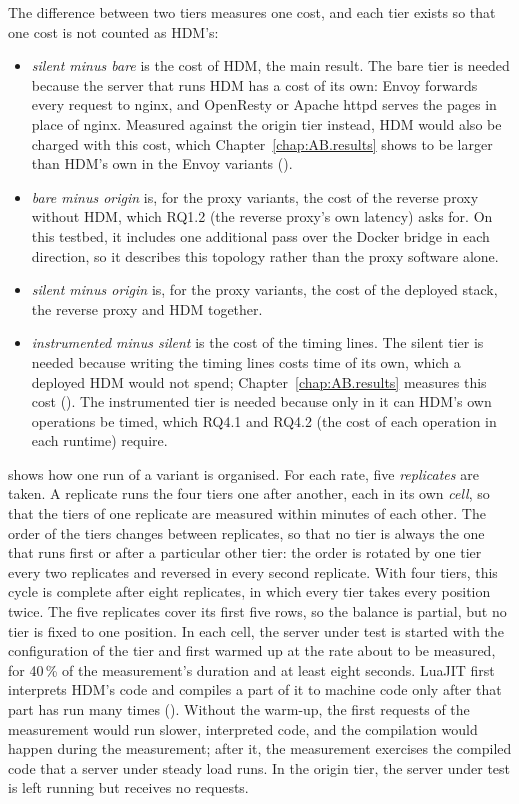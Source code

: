 \documentclass{rptuma}
\begin{document}
The difference between two tiers measures one cost, and each tier exists so that one cost is not
counted as HDM's:
\begin{itemize}
  \item \emph{silent minus bare} is the cost of HDM, the main result. The bare tier is needed because
    the server that runs HDM has a cost of its own: Envoy forwards every request to nginx, and
    OpenResty or Apache httpd serves the pages in place of nginx. Measured against the origin tier
    instead, HDM would also be charged with this cost, which Chapter~\ref{chap:AB.results} shows to
    be larger than HDM's own in the Envoy variants ().
  \item \emph{bare minus origin} is, for the proxy variants, the cost of the reverse proxy without
    HDM, which RQ1.2 (the reverse proxy's own latency) asks for. On this testbed, it includes one
    additional pass over the Docker bridge in each direction, so it describes this topology rather
    than the proxy software alone.
  \item \emph{silent minus origin} is, for the proxy variants, the cost of the deployed stack, the
    reverse proxy and HDM together.
  \item \emph{instrumented minus silent} is the cost of the timing lines. The silent tier is needed
    because writing the timing lines costs time of its own, which a deployed HDM would not spend;
    Chapter~\ref{chap:AB.results} measures this cost (). The instrumented
    tier is needed because only in it can HDM's own operations be timed, which RQ4.1 and RQ4.2 (the
    cost of each operation in each runtime) require.
\end{itemize}

 shows how one run of a variant is organised. For each rate, five
\emph{replicates} are taken. A replicate runs the four tiers one after another, each in its own
\emph{cell}, so that the tiers of one replicate are measured within minutes of each other. The order
of the tiers changes between replicates, so that no tier is always the one that runs first or after
a particular other tier: the order is rotated by one tier every two replicates and reversed in every
second replicate. With four tiers, this cycle is complete after eight replicates, in which every
tier takes every position twice. The five replicates cover its first five rows, so the balance is
partial, but no tier is fixed to one position. In each cell, the server under test is started with the configuration of the tier and first warmed
up at the rate about to be measured, for 40\,\% of the measurement's duration and at least eight
seconds. LuaJIT first interprets HDM's code and compiles a part of it to machine code only after
that part has run many times (). Without the warm-up, the first requests
of the measurement would run slower, interpreted code, and the compilation would happen during the
measurement; after it, the measurement exercises the compiled code that a server under steady load
runs. In the origin tier, the server under test is left running but receives no
requests.
\end{document}
